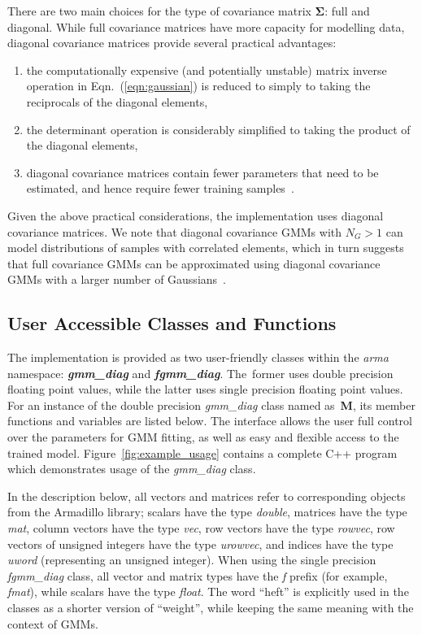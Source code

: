 \documentclass[10pt,a4paper]{article}
\def\Mat#1{{\boldsymbol{#1}}}
\begin{document}
There are two main choices for the type of covariance matrix $\Mat{\Sigma}$: full and diagonal.
While full covariance matrices have more capacity for modelling data,
diagonal covariance matrices provide several practical advantages:
%
\begin{enumerate}[{\bf (i)}]
\item
the computationally expensive (and potentially unstable) matrix inverse operation in Eqn.~(\ref{eqn:gaussian})
is reduced to simply to taking the reciprocals of the diagonal elements,

\item
the determinant operation is considerably simplified to taking the product of the diagonal elements,

\item
diagonal covariance matrices contain fewer parameters that need to be estimated, and hence require fewer training samples~\cite{Duda01}.
\end{enumerate}

Given the above practical considerations, the implementation uses diagonal covariance matrices.
We note that diagonal covariance GMMs with $N_G > 1$ can model distributions of samples with correlated elements,
which in turn suggests that full covariance GMMs can be approximated using diagonal covariance GMMs with a larger number of Gaussians~\cite{Reynolds_2000}.



\subsection{User Accessible Classes and Functions}

The implementation is provided as two user-friendly classes within the {\it arma} namespace:
{\it\bfseries gmm\_diag} and {\it\bfseries fgmm\_diag}.
The~former uses double precision floating point values, while the latter uses single precision floating point values.
For an instance of the double precision {\it gmm\_diag} class named as~{\bf M},
its member functions and variables are listed below.
The interface allows the user full control over the parameters for GMM fitting,
as well as easy and flexible access to the trained model.
Figure~\ref{fig:example_usage} contains a complete C++ program which demonstrates usage of the {\it gmm\_diag} class.

In the description below, all vectors and matrices refer to corresponding objects from the Armadillo library;
scalars have the type {\it double},
matrices have the type {\it mat},
column vectors have the type {\it vec},
row vectors have the type {\it rowvec},
row vectors of unsigned integers have the type {\it urowvec},
and indices have the type {\it uword} (representing an unsigned integer).
When using the single precision {\it fgmm\_diag} class,
all vector and matrix types have the {\it f} prefix (for example, {\it fmat}),
while scalars have the type {\it float}.
The word ``heft'' is explicitly used in the classes as a shorter version of ``weight'', while keeping the same meaning with the context of GMMs.
\end{document}
